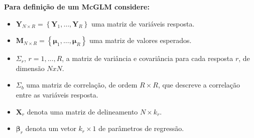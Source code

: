 \documentclass[10pt,
  aspectratio=169,
  serif,
  mathserif,
  professionalfont,
  compress,
  handout,
  ]{beamer}\usepackage[]{graphicx}\usepackage[]{color}
\begin{document}
\begin{frame}[c, allowframebreaks]

\textbf{Para definição de um McGLM considere:}

\begin{itemize}
  
  \item $\boldsymbol{Y}_{N \times R} = \left \{ \boldsymbol{Y}_1, \dots, \boldsymbol{Y}_R \right \}$ uma  matriz de variáveis resposta.
  
  \item $\boldsymbol{M}_{N \times R} = \left \{ \boldsymbol{\mu}_1, \dots, \boldsymbol{\mu}_R \right \}$ uma matriz de valores esperados.
  
  \item $\Sigma_r$, $r = 1,..., R$, a matriz de variância e covariância para cada resposta $r$, de dimensão $NxN$.
  
  \item $\Sigma_b$ uma matriz de correlação, de ordem $R \times R$, que descreve a correlação entre as variáveis resposta.
  
    \item $\boldsymbol{X}_r$ denota uma matriz de delineamento $N \times k_r$.
  
  \item $\boldsymbol{\beta}_r$ denota um vetor $k_r \times 1$ de parâmetros de regressão.
  
\end{itemize}

\end{frame}

\end{document}

